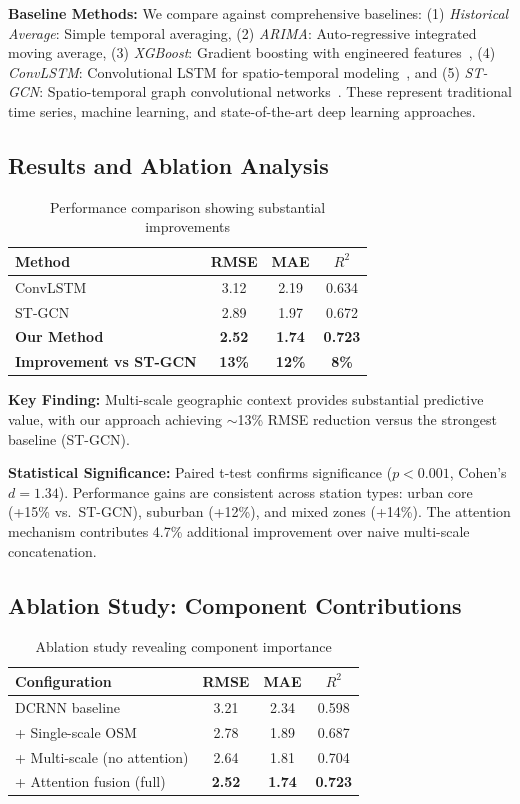 \documentclass{article}
\begin{document}
\textbf{Baseline Methods:} We compare against comprehensive baselines: (1) \textit{Historical Average}: Simple temporal averaging, (2) \textit{ARIMA}: Auto-regressive integrated moving average, (3) \textit{XGBoost}: Gradient boosting with engineered features~\cite{chen2016}, (4) \textit{ConvLSTM}: Convolutional LSTM for spatio-temporal modeling~\cite{xingjian2015}, and (5) \textit{ST-GCN}: Spatio-temporal graph convolutional networks~\cite{yu2018}. These represent traditional time series, machine learning, and state-of-the-art deep learning approaches.

\subsection{Results and Ablation Analysis}

\begin{table}[ht]
\centering
\caption{Performance comparison showing substantial improvements}
\small
\begin{tabular}{lccc}
\toprule
Method & RMSE & MAE & $R^2$ \\
\midrule
ConvLSTM & 3.12 & 2.19 & 0.634 \\
ST-GCN & 2.89 & 1.97 & 0.672 \\
\textbf{Our Method} & \textbf{2.52} & \textbf{1.74} & \textbf{0.723} \\
\textbf{Improvement vs ST-GCN} & \textbf{13\%} & \textbf{12\%} & \textbf{8\%} \\
\bottomrule
\end{tabular}
\end{table}

\textbf{Key Finding:} Multi-scale geographic context provides substantial predictive value, with our approach achieving $\sim$13\% RMSE reduction versus the strongest baseline (ST-GCN).

\textbf{Statistical Significance:} Paired t-test confirms significance ($p < 0.001$, Cohen's $d = 1.34$). Performance gains are consistent across station types: urban core (+15\% vs.\ ST-GCN), suburban (+12\%), and mixed zones (+14\%). The attention mechanism contributes 4.7\% additional improvement over naive multi-scale concatenation.

\subsection{Ablation Study: Component Contributions}

\begin{table}[ht]
\centering
\caption{Ablation study revealing component importance}
\small
\begin{tabular}{lccc}
\toprule
Configuration & RMSE & MAE & $R^2$ \\
\midrule
DCRNN baseline & 3.21 & 2.34 & 0.598 \\
+ Single-scale OSM & 2.78 & 1.89 & 0.687 \\
+ Multi-scale (no attention) & 2.64 & 1.81 & 0.704 \\
+ Attention fusion (full) & \textbf{2.52} & \textbf{1.74} & \textbf{0.723} \\
\bottomrule
\end{tabular}
\end{table}
\end{document}
